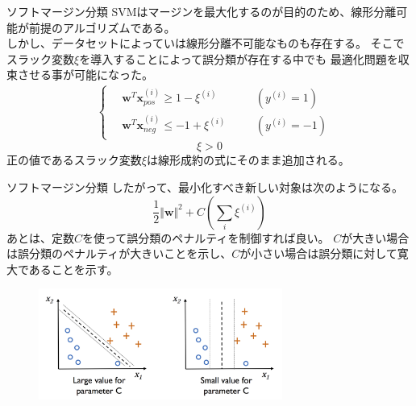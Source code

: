 \documentclass[aspectratio=169, dvipdfmx, 11pt]{beamer} %
\begin{document}
\begin{frame}{ソフトマージン分類}
    SVMはマージンを最大化するのが目的のため、線形分離可能が前提のアルゴリズムである。\\
    しかし、データセットによっていは線形分離不可能なものも存在する。
    そこでスラック変数\(\xi\)を導入することによって誤分類が存在する中でも
    最適化問題を収束させる事が可能になった。
    \begin{equation*}
        \begin{aligned}
            & \left\{ \,
                \begin{aligned}
                    & \bm{w}^T \bm{x}_{pos}^{(i)} \geq  1 - \xi^{(i)} & \quad &(y^{(i)} = 1)\\
                    & \bm{w}^T \bm{x}_{neg}^{(i)} \leq  -1 + \xi^{(i)} & \quad &(y^{(i)} = -1)
                \end{aligned}
            \right.
        \end{aligned}
    \end{equation*}
    \begin{equation*}
        \xi > 0
    \end{equation*}
    正の値であるスラック変数\(\xi\)は線形成約の式にそのまま追加される。
\end{frame}

\begin{frame}{ソフトマージン分類}
    したがって、最小化すべき新しい対象は次のようになる。
    \begin{equation*}
        \frac{1}{2}\Vert\bm{w}\Vert^2 + C(\sum_{i}^{}\xi^{(i)})
    \end{equation*}
    あとは、定数\(C\)を使って誤分類のペナルティを制御すれば良い。
    \(C\)が大きい場合は誤分類のペナルティが大きいことを示し、\(C\)が小さい場合は誤分類に対して寛大であることを示す。
    \begin{figure}[b]
        \begin{center}
        \includegraphics[width=80mm]{img/day02/fig06.png}
        \end{center}
    \end{figure}
\end{frame}
\end{document}
